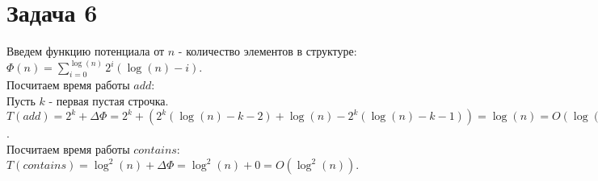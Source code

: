 \documentclass{article}
\begin{document}
	\section*{Задача 6}
	Введем функцию потенциала от $n$ - количество элементов в структуре: $\Phi(n) = \sum_{i = 0}^{\log(n)}{2^i(\log(n) - i)}$.
	\\
	Посчитаем время работы $add$: 
	\\
	Пусть $k$ - первая пустая строчка.
	\\
	$T(add) = 2^k + \Delta\Phi = 2^k + (2^k(\log(n) - k - 2) + \log(n) - 2^k(\log(n) - k - 1)) = \log(n) = O(\log(n))$.
	\\
	Посчитаем время работы $contains$:
	\\ 
	$T(contains) = \log^2(n) + \Delta\Phi = \log^2(n) + 0 = O(\log^2(n))$.
	
	
\end{document}
